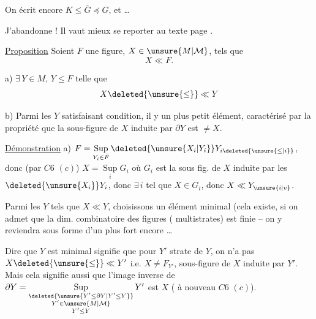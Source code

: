 On écrit encore $K\leq\bar G\preceq G$, et \ldots

 J'abandonne ! Il vaut mieux se reporter au texte page .




\uline{Proposition} Soient $F$ une figure, $X\in\unsure{M|\mathcal M}$, tels que
\[
 X\ll F.
\]

a)  $\exists\,Y\in M$, $Y\leq F$ telle que
\[
 X\deleted{\unsure{\leq}}\ll Y
\]

b) Parmi les $Y$ satisfaisant  condition, il y un plus petit élément,     caractérisé par la propriété que la sous-figure de $X$ induite par $\partial Y$ est $\neq X$.

\uline{Démonstration} a) $F=\mathop{\mathrm{Sup}}\limits_{Y_i\in\bar F}\deleted{\unsure{X_i|Y_i}}Y_{i\deleted{\unsure{\leq|i}}}$, donc  (par $C6$ $(c)$) $X=\mathop{\mathrm{Sup}}\limits_{i}G_i$ où $G_i$ est la sous fig. de $X$ induite par les $\deleted{\unsure{X_i}}Y_i$, donc $\exists\,i$ tel que $X\in G_i$, donc $X\ll Y_{\unsure{i|v}}$.

Parmi les $Y$ tels que $X\ll Y$, choisissons un élément minimal (cela existe, si on admet que la dim. combinatoire des figures  ( multistrates) est finie -- on y reviendra sous forme d'un  plus fort encore \ldots\ 

Dire que $Y$ est minimal signifie que pour $Y'$ strate de $Y$, on n'a pas $X\deleted{\unsure{\leq}}\ll Y'$ i.e. $X\neq F_{Y'}$, sous-figure de $X$ induite par $Y'$. Mais cela signifie aussi que l'image inverse de $\partial Y=\mathop{\mathrm{Sup}}\limits_{\substack{\deleted{\unsure{Y'\leq\partial Y|Y'\leq Y}}\\Y'\in\unsure{M|\mathcal M}\\Y'\leq Y}}Y'$ est   $X$ ( à nouveau $C6$ $(c)$). 

